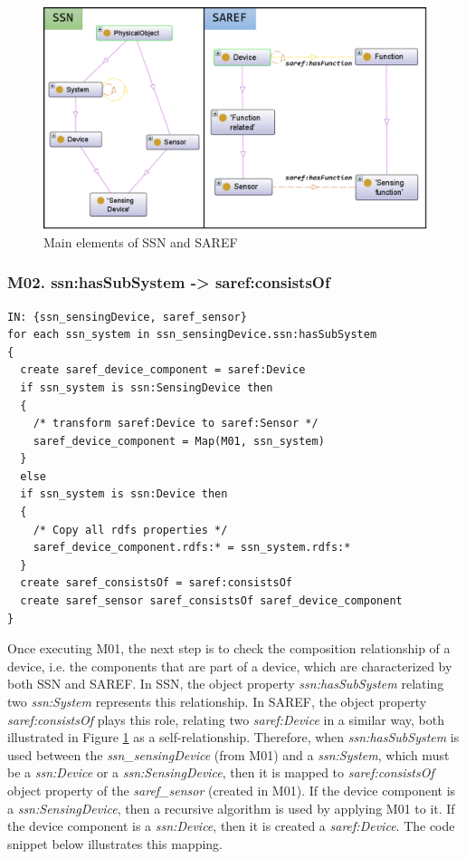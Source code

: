 \documentclass{sig-alternate-05-2015}
\begin{document}
\begin{figure}[h!]
\centering
\includegraphics[scale=0.28]{SSN_SAREF_SensingDevice_Device}
\caption{Main elements of SSN and SAREF}
\label{fig:SSN_SAREF_SensingDevice_Device}
\end{figure}

\subsubsection{M02. ssn:\-hasSubSystem -> saref:\-consistsOf}


\begin{lstlisting}[caption={Pseudocode snippet for M02},label={code:sample}]
IN: {ssn_sensingDevice, saref_sensor}
for each ssn_system in ssn_sensingDevice.ssn:hasSubSystem 
{ 
  create saref_device_component = saref:Device 
  if ssn_system is ssn:SensingDevice then 
  { 
    /* transform saref:Device to saref:Sensor */
    saref_device_component = Map(M01, ssn_system) 
  } 
  else 
  if ssn_system is ssn:Device then 
  { 
    /* Copy all rdfs properties */ 
    saref_device_component.rdfs:* = ssn_system.rdfs:* 
  } 
  create saref_consistsOf = saref:consistsOf 
  create saref_sensor saref_consistsOf saref_device_component 
}
\end{lstlisting}

Once executing M01, the next step is to check the composition relationship of a device, i.e. the components that are part of a device, which are characterized by both SSN and SAREF. In SSN, the object property \textit{ssn:\-hasSubSystem} relating two \textit{ssn:\-System} represents this relationship. In SAREF, the object property \textit{saref:\-consistsOf} plays this role, relating two \textit{saref:\-Device} in a similar way, both illustrated in Figure \ref{fig:SSN_SAREF_SensingDevice_Device} as a self-relationship. Therefore, when \textit{ssn:\-hasSubSystem} is used between the \textit{ssn\_sensingDevice} (from M01) and a \textit{ssn:\-System}, which must be a \textit{ssn:\-Device} or a \textit{ssn:\-SensingDevice}, then it is mapped to \textit{saref:\-consistsOf} object property of the \textit{saref\_sensor} (created in M01). If the device component is a \textit{ssn:\-SensingDevice}, then a recursive algorithm is used by applying M01 to it. If the device component is a \textit{ssn:\-Device}, then it is created a \textit{saref:\-Device}. The code snippet below illustrates this mapping.
\end{document}
